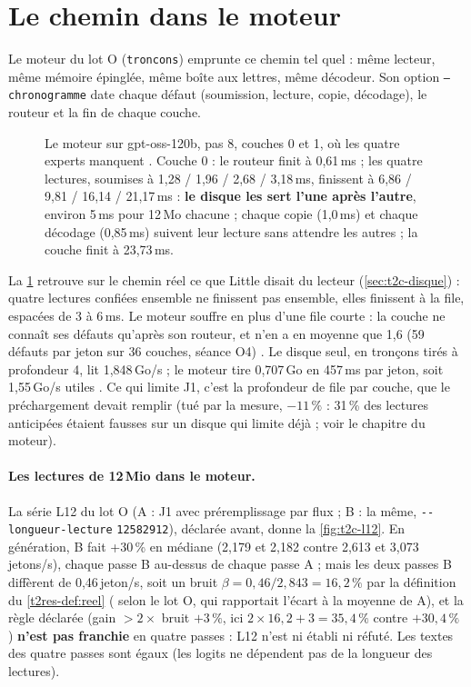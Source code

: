 \section{Le chemin dans le moteur}\label{sec:t2c-moteur}

Le moteur du lot O (\texttt{troncons}) emprunte ce chemin tel quel : même lecteur, même mémoire épinglée, même boîte aux lettres, même décodeur. Son option \texttt{--chronogramme} date chaque défaut (soumission, lecture, copie, décodage), le routeur et la fin de chaque couche.

\begin{figure}[ht]
\centering
\GrapheChmCouche
\caption[Le moteur : deux couches du 120b, chaque défaut daté]{Le moteur sur gpt-oss-120b, pas 8, couches 0 et 1, où les quatre experts manquent \mes. Couche 0 : le routeur finit à 0,61\,ms ; les quatre lectures, soumises à 1,28 / 1,96 / 2,68 / 3,18\,ms, finissent à 6,86 / 9,81 / 16,14 / 21,17\,ms : \textbf{le disque les sert l'une après l'autre}, environ 5\,ms pour 12\,Mo chacune ; chaque copie (1,0\,ms) et chaque décodage (0,85\,ms) suivent leur lecture sans attendre les autres ; la couche finit à 23,73\,ms.}
\label{fig:t2c-couche}
\end{figure}

La \cref{fig:t2c-couche} retrouve sur le chemin réel ce que Little disait du lecteur (\cref{sec:t2c-disque}) : quatre lectures confiées ensemble ne finissent pas ensemble, elles finissent à la file, espacées de 3 à 6\,ms. Le moteur souffre en plus d'une file courte : la couche ne connaît ses défauts qu'après son routeur, et n'en a en moyenne que 1,6 (59 défauts par jeton sur 36 couches, séance O4) \mes. Le disque seul, en tronçons tirés à profondeur 4, lit 1,848\,Go/s ; le moteur tire 0,707\,Go en 457\,ms par jeton, soit 1,55\,Go/s utiles \calc. Ce qui limite J1, c'est la profondeur de file par couche, que le préchargement devait remplir (tué par la mesure, $-11\,\%$ : 31\,\% des lectures anticipées étaient fausses sur un disque qui limite déjà ; voir le chapitre du moteur).

\paragraph{Les lectures de 12\,Mio dans le moteur.} La série L12 du lot O (A : J1 avec préremplissage par flux ; B : la même, \texttt{-{}-\allowbreak longueur-\allowbreak lecture} \texttt{12582912}), déclarée avant, donne la \cref{fig:t2c-l12}. En génération, B fait +30\,\% en médiane (2,179 et 2,182 contre 2,613 et 3,073\,jetons/s), chaque passe B au-dessus de chaque passe A ; mais les deux passes B diffèrent de 0,46\,jeton/s, soit un bruit $\beta = 0{,}46 / 2{,}843 = 16{,}2\,\%$ par la définition du \cref{t2res-def:reel} ( selon le lot O, qui rapportait l'écart à la moyenne de A), et la règle déclarée (gain $> 2 \times$ bruit $+ 3\,\%$, ici $2 \times 16{,}2 + 3 = 35{,}4\,\%$ contre $+30{,}4\,\%$ \calc) \textbf{n'est pas franchie} en quatre passes : L12 n'est ni établi ni réfuté. Les textes des quatre passes sont égaux (les logits ne dépendent pas de la longueur des lectures).


